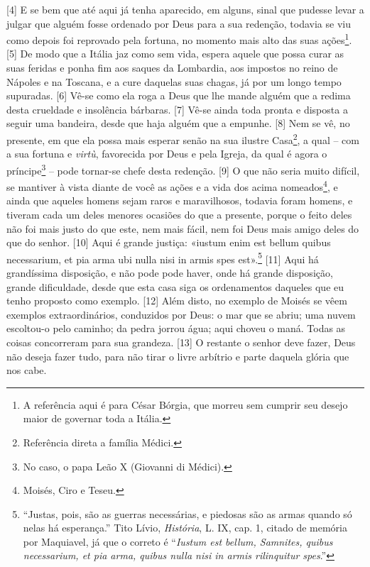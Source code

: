 {[}4{]} E se bem que até aqui já tenha aparecido, em alguns, sinal que
pudesse levar a julgar que alguém fosse ordenado por Deus para a sua
redenção, todavia se viu como depois foi reprovado pela fortuna, no
momento mais alto das suas ações\footnote{A referência aqui é para César
  Bórgia, que morreu sem cumprir seu desejo maior de governar toda a
  Itália.}. {[}5{]} De modo que a Itália jaz como sem vida, espera
aquele que possa curar as suas feridas e ponha fim aos saques da
Lombardia, aos impostos no reino de Nápoles e na Toscana, e a cure
daquelas suas chagas, já por um longo tempo supuradas. {[}6{]} Vê-se
como ela roga a Deus que lhe mande alguém que a redima desta crueldade e
insolência bárbaras. {[}7{]} Vê-se ainda toda pronta e disposta a seguir
uma bandeira, desde que haja alguém que a empunhe. {[}8{]} Nem se vê, no
presente, em que ela possa mais esperar senão na sua ilustre
Casa\footnote{Referência direta a família Médici.}, a qual -- com a sua
fortuna e \emph{virtù}, favorecida por Deus e pela Igreja, da qual é
agora o príncipe\footnote{No caso, o papa Leão X (Giovanni di Médici).}
-- pode tornar-se chefe desta redenção. {[}9{]} O que não seria muito
difícil, se mantiver à vista diante de você as ações e a vida dos acima
nomeados\footnote{Moisés, Ciro e Teseu.}, e ainda que aqueles homens
sejam raros e maravilhosos, todavia foram homens, e tiveram cada um
deles menores ocasiões do que a presente, porque o feito deles não foi
mais justo do que este, nem mais fácil, nem foi Deus mais amigo deles do
que do senhor. {[}10{]} Aqui é grande justiça: «iustum enim est bellum
quibus necessarium, et pia arma ubi nulla nisi in armis spes
est».\footnote{``Justas, pois, são as guerras necessárias, e piedosas
  são as armas quando só nelas há esperança.'' Tito Lívio,
  \emph{História}, L. IX, cap. 1, citado de memória por Maquiavel, já
  que o correto é ``\emph{Iustum est bellum, Samnites, quibus
  necessarium, et pia arma, quibus nulla nisi in armis rilinquitur
  spes}.''} {[}11{]} Aqui há grandíssima disposição, e não pode pode
haver, onde há grande disposição, grande dificuldade, desde que esta
casa siga os ordenamentos daqueles que eu tenho proposto como exemplo.
{[}12{]} Além disto, no exemplo de Moisés se vêem exemplos
extraordinários, conduzidos por Deus: o mar que se abriu; uma nuvem
escoltou-o pelo caminho; da pedra jorrou água; aqui choveu o maná. Todas
as coisas concorreram para sua grandeza. {[}13{]} O restante o senhor
deve fazer, Deus não deseja fazer tudo, para não tirar o livre arbítrio
e parte daquela glória que nos cabe.


